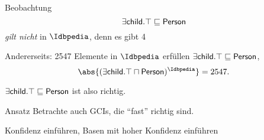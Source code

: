 \documentclass[ngerman]{beamer}
\begin{document}
\begin{frame}
  

  \begin{block}{Beobachtung}
    \begin{equation*}
      \sf \exists child. \top \sqsubseteq Person
    \end{equation*}
    \emph{gilt nicht} in $\Idbpedia$, denn es gibt 4 
    \begin{overlayarea}{\textwidth}{5ex}
    \end{overlayarea}


    \bigskip{}

    Andererseits: 2547 Elemente in $\Idbpedia$ erfüllen $\sf \exists child. \top
    \sqsubseteq \sf Person$, \dh
    \begin{equation*}
      \abs{ (\sf \exists child.\top \sqcap Person)^{\Idbpedia} } = 2547.
    \end{equation*}


    $\sf \exists child. \top \sqsubseteq Person$ ist also
     richtig.
  \end{block}

\end{frame}

\begin{frame}

  \onslide<+->

  \begin{block}{Ansatz}
    Betrachte auch GCIs, die \enquote{fast} richtig sind.
  \end{block}

  \onslide<+->

  Konfidenz einführen, Basen mit hoher Konfidenz einführen
\end{frame}
\end{document}
